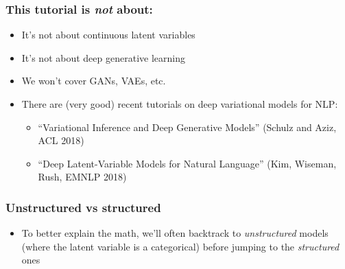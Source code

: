 \begin{frame}
\frametitle{This tutorial is \emph{not} about:}

\begin{itemize}
\item It's not about continuous latent variables
\item It's not about deep generative learning
\item We won't cover GANs, VAEs, etc.
\item There are (very good) recent tutorials on deep variational models for NLP:
\begin{itemize}
\item ``Variational Inference and Deep Generative Models'' (Schulz and Aziz, ACL 2018)
\item ``Deep Latent-Variable Models for Natural Language'' (Kim, Wiseman, Rush, EMNLP 2018)
\end{itemize}
\end{itemize}

\end{frame}



\begin{frame}%
\frametitle{Unstructured vs structured}%

\begin{itemize}
\item To better explain the math, we'll often backtrack to \emph{unstructured} models (where the latent variable is a categorical) before jumping to the \emph{structured} ones
\end{itemize}
\end{frame}


